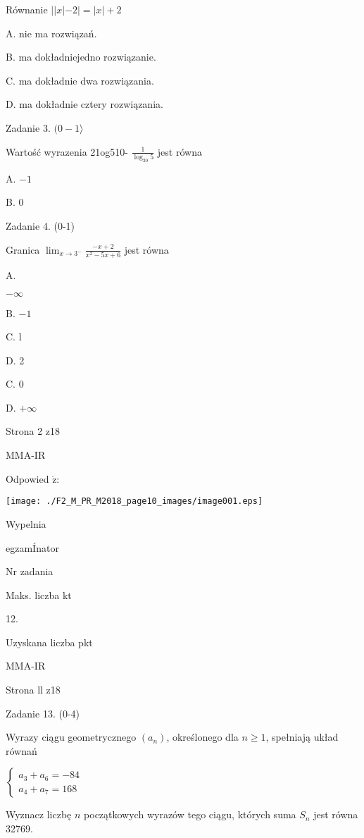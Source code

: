 \documentclass[a4paper,12pt]{article}
\begin{document}
Równanie $||x|-2|=|x|+2$

A. nie ma rozwiązań.

B. ma dokładniejedno rozwiązanie.

C. ma dokładnie dwa rozwiązania.

D. ma dokładnie cztery rozwiązania.

Zadanie 3. $(0-1\rangle$

Wartość wyrazenia 21og510- $\displaystyle \frac{1}{\log_{20}5}$ jest równa

A. $-1$

B. 0

Zadanie 4. (0-1)

Granica $\displaystyle \lim_{x\rightarrow 3^{-}}\frac{-x+2}{x^{2}-5x+6}$ jest równa

A.

$-\infty$

B. $-1$

C. l

D. 2

C. 0

D. $+\infty$

Strona 2 z18

MMA-IR





Odpowied $\acute{\mathrm{z}}$:
\begin{center}
\texttt{[image: ./F2\_M\_PR\_M2018\_page10\_images/image001.eps]}
\end{center}
Wypelnia

egzamÍnator

Nr zadania

Maks. liczba kt

12.

Uzyskana liczba pkt

MMA-IR

Strona ll z18





Zadanie 13. (0-4)

Wyrazy ciągu geometrycznego $(a_{n})$, określonego dla $n\geq 1$, spełniają układ równań

$\left\{\begin{array}{l}
a_{3}+a_{6}=-84\\
a_{4}+a_{7}=168
\end{array}\right.$

Wyznacz liczbę $n$ początkowych wyrazów tego ciągu, których suma $S_{n}$ jest równa 32769.
\end{document}
